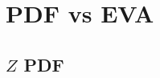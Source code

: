 \documentclass[a4paper,11pt]{article}
\begin{document}
%
%


\clearpage






\appendix

\clearpage

\section{PDF vs EVA}
\label{app:PDFsEVA}

\subsection{$Z$ PDF}
\label{app:PDFsEVA_Z}
\end{document}
